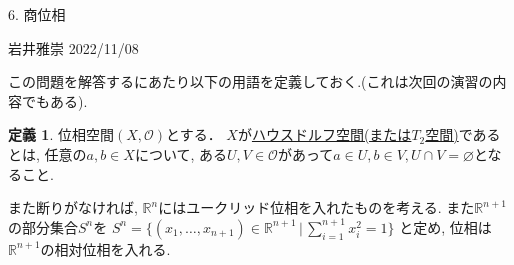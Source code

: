 \documentclass[dvipdfmx,a4paper,11pt]{article}
\newcommand{\R}{\mathbb{R}}
\theoremstyle{definition}
\newtheorem{dfn}[thm]{定義}
\begin{document}
\newpage


\begin{center}
{\Large 6. 商位相}
\end{center}

\begin{flushright}
 岩井雅崇 2022/11/08
\end{flushright}

この問題を解答するにあたり以下の用語を定義しておく.(これは次回の演習の内容でもある).
   \begin{tcolorbox}[
    colback = white,
    colframe = green!35!black,
    fonttitle = \bfseries,
    breakable = true]
    \begin{dfn}
位相空間$(X, \mathscr{O})$とする．
$X$が\underline{ハウスドルフ空間(または$T_2$空間)}であるとは, 任意の$a, b \in X$について, ある$U, V \in \mathscr{O}$があって$a \in U, b \in V, U \cap V = \varnothing $となること.
  \end{dfn}
 \end{tcolorbox}
 
また断りがなければ, $\R^{n}$にはユークリッド位相を入れたものを考える. また$\R^{n+1}$の部分集合$S^n$を
$S^n = \{ (x_1, \ldots, x_{n+1}) \in \R^{n+1} \, |\,\sum_{i=1}^{n+1} x_{i}^{2} =1\}$
と定め, 位相は$\R^{n+1}$の相対位相を入れる. 
\end{document}
